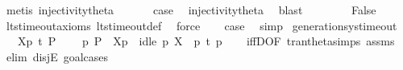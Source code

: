 \begin{isabellebody}
\ {\isacharparenleft}{\kern0pt}metis\ injectivity{\isacharunderscore}{\kern0pt}theta{\isacharparenleft}{\kern0pt}{}{\isacharparenright}{\kern0pt}{\isacharparenright}{\kern0pt}\isanewline
\ \ \isamarkupfalse%
\ {}\ \isamarkupfalse%
\ {\isacharquery}{\kern0pt}case\ \isamarkupfalse%
\ injectivity{\isacharunderscore}{\kern0pt}theta{\isacharparenleft}{\kern0pt}{}{\isacharparenright}{\kern0pt}\ \isamarkupfalse%
\ blast\isanewline
{}\isamarkupfalse%
\isanewline
\ \ \isamarkupfalse%
\ {}\isanewline
\ \ \isamarkupfalse%
\ False\ \isamarkupfalse%
\ lts{\isacharunderscore}{\kern0pt}timeout{\isacharunderscore}{\kern0pt}axioms\ lts{\isacharunderscore}{\kern0pt}timeout{\isacharunderscore}{\kern0pt}def\ \isamarkupfalse%
\ force\isanewline
\ \ \isamarkupfalse%
\ {\isacharquery}{\kern0pt}case\ \isamarkupfalse%
\ simp\isanewline
{}\isamarkupfalse%
%
\endisatagproof
{\isafoldproof}%
%
\isadelimproof
\isanewline
%
\endisadelimproof
\isanewline
{}\isamarkupfalse%
\ generation{\isacharunderscore}{\kern0pt}sys{\isacharunderscore}{\kern0pt}timeout{\isacharcolon}{\kern0pt}\isanewline
\ \ \ {\isacartoucheopen}{\isasymtheta}{\isacharbrackleft}{\kern0pt}X{\isacharbrackright}{\kern0pt}{\isacharparenleft}{\kern0pt}p{\isacharparenright}{\kern0pt}\ {\isasymlongmapsto}\isactrlsup {\isasymtheta}t\ P{\isacharprime}{\kern0pt}{\isacartoucheclose}\isanewline
\ \ \ {\isacartoucheopen}{\isasymexists}\ p{\isacharprime}{\kern0pt}{\isachardot}{\kern0pt}\ P{\isacharprime}{\kern0pt}\ {\isacharequal}{\kern0pt}\ {\isasymtheta}{\isacharbrackleft}{\kern0pt}X{\isacharbrackright}{\kern0pt}{\isacharparenleft}{\kern0pt}p{\isacharprime}{\kern0pt}{\isacharparenright}{\kern0pt}\ {\isasymand}\ idle\ p\ X\ {\isasymand}\ p\ {\isasymlongmapsto}t\ p{\isacharprime}{\kern0pt}{\isacartoucheclose}\isanewline
%
\isadelimproof
\ \ %
\endisadelimproof
%
\isatagproof
{}\isamarkupfalse%
\ iffD{}{\isacharbrackleft}{\kern0pt}OF\ tran{\isacharunderscore}{\kern0pt}theta{\isachardot}{\kern0pt}simps\ assms{\isacharbrackright}{\kern0pt}\isanewline
{}\isamarkupfalse%
\ {\isacharparenleft}{\kern0pt}elim\ disjE{\isacharcomma}{\kern0pt}\ goal{\isacharunderscore}{\kern0pt}cases{\isacharparenright}{\kern0pt}\isanewline
\ \ \isamarkupfalse%
\ {}\isanewline
\ \ \isamarkupfalse%

\end{isabellebody}
